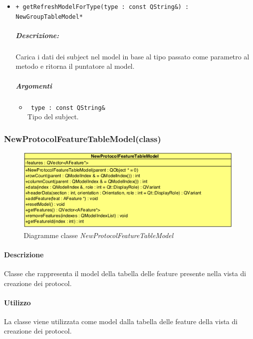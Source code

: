 {\begin{itemize}
	\item \color{blue}\verb!+ getRefreshModelForType(type : const QString&) : NewGroupTableModel*!\\
		\color{black}
		\subparagraph{Descrizione:} Carica i dati dei subject\g{} nel model in base al tipo passato come parametro al metodo e ritorna il puntatore al model.\\
		\subparagraph{Argomenti}
			\begin{itemize}				
				\item \color{RoyalPurple}\verb! type : const QString&!\\
				\color{black} Tipo del subject\g{}.
			\end{itemize}
\end{itemize}
\pagebreak


\subsubsection{NewProtocolFeatureTableModel(class)}
\label{NewProtocolFeatureTableModel}
\begin{figure}[!h]
	\centering
	\includegraphics[width=0.6\linewidth]{./Content/Immagini/QtModel/NewProtocolFeatureTableModel.png}
	\caption{Diagramme classe \textsl{NewProtocolFeatureTableModel}}
	\label{comp_NewProtocolFeatureTableModel}
\end{figure}

\paragraph{Descrizione\\} 
Classe che rappresenta il model della tabella delle feature\g{} presente nella vista di creazione dei protocol\g{}.

\paragraph{Utilizzo\\}
La classe viene utilizzata come model dalla tabella delle feature\g{} della vista di creazione dei protocol\g{}.

}
